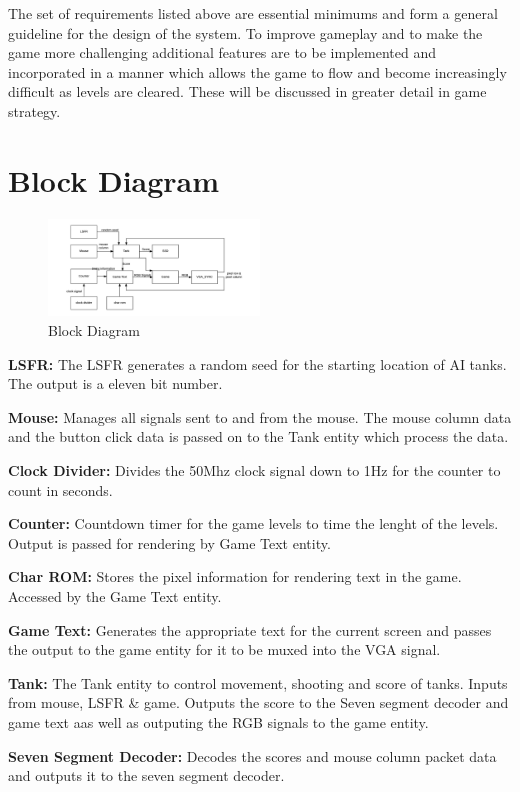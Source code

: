 \documentclass{article}
\begin{document}
The set of requirements listed above are essential minimums and form a general guideline for the design of the system. To improve gameplay and to make the game more challenging additional features are to be implemented and incorporated in a manner which allows the game to flow and become increasingly difficult as levels are cleared. These will be discussed in greater detail in game strategy.

\section{Block Diagram}

\begin{figure}[!h]
\centerline{\includegraphics[width=0.5\textwidth]{block_diagram}}
\caption{Block Diagram}
\label{fig:rawFrame}
\end{figure}

\quad\textbf{LSFR:} The LSFR generates a random seed for the starting location of AI tanks. The output is a eleven bit number.

\textbf{Mouse:} Manages all signals sent to and from the mouse. The mouse column data and the button click data is passed on to the Tank entity which process the data.

\textbf{Clock Divider:} Divides the 50Mhz clock signal down to 1Hz for the counter to count in seconds.

\textbf{Counter:} Countdown timer for the game levels to time the lenght of the levels. Output is passed for rendering by Game Text entity.

\textbf{Char ROM:} Stores the pixel information for rendering text in the game. Accessed by the Game Text entity.

\textbf{Game Text:} Generates the appropriate text for the current screen and passes the output to the game entity for it to be muxed into the VGA signal.

\textbf{Tank:} The Tank entity to control movement, shooting and score of tanks. Inputs from mouse, LSFR \& game. Outputs the score to the Seven segment decoder and game text aas well as outputing the RGB signals to the game entity.

\textbf{Seven Segment Decoder:} Decodes the scores and mouse column packet data and outputs it to the seven segment decoder.
\end{document}
